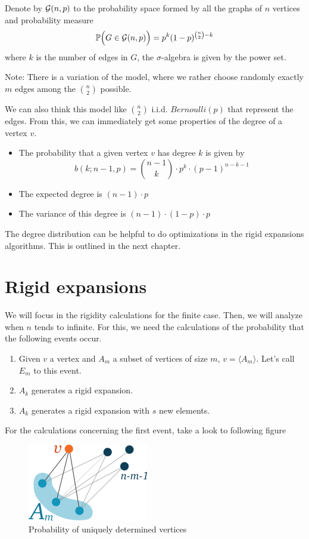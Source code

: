 \begin{defini}
Denote by $\mathcal{G}(n,p)$ to the probability space formed by all the graphs of $n$ vertices and probability measure 
$$ \mathbb{P}\Big(G\in \mathcal{G}(n,p)\Big) = p^{k} (1-p)^{\binom{n}{2}-k} $$
where $k$ is the number of edges in $G$, the $\sigma$-algebra is given by the power set.
\end{defini}

Note: There is a variation of the model, where we rather choose randomly exactly $m$ edges among the $\binom{n}{2}$ possible.

We can also think this model like $\binom{n}{2}$ i.i.d. $Bernoulli(p)$ that represent the edges. From this, we can immediately get some properties of the degree of a vertex $v$.

\begin{itemize}
\item The probability that a given vertex $v$ has degree $k$ is given by
$$b(k; n-1,p) = \binom{n-1}{k} \cdot p^{k} \cdot (p-1)^{n-k-1}$$
\item The expected degree is $(n-1)\cdot p$
\item The variance of this degree is $(n-1)\cdot (1-p) \cdot p$
\end{itemize}

The degree distribution can be helpful to do optimizations in the rigid expansions algorithms. This is outlined in the next chapter.

\section{Rigid expansions}

 We will focus in the rigidity calculations for the finite case. Then, we will analyze when $n$ tends to infinite. For this, we need the calculations of the probability that the following events occur.

\begin{enumerate}
\item Given $v$ a vertex and $A_{m}$ a subset of vertices of size $m$, $v=\langle A_{m}\rangle$. Let's call $E_{m}$ to this event.
\item $A_k$ generates a rigid expansion.
\item $A_k$ generates a rigid expansion with $s$ new elements.
\end{enumerate}

For the calculations concerning the first event, take a look to following figure

\begin{figure}[h!]
	\centering
	\includegraphics[scale=1]{Figures/uni.png}
	\caption{Probability of uniquely determined vertices}
\end{figure}

